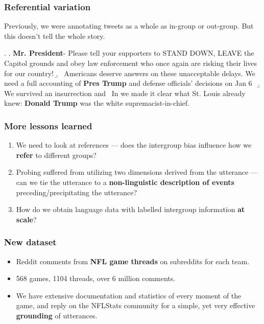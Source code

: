 \begin{frame}[c]\frametitle{Referential variation}
    Previously, we were annotating tweets as a whole as in-group or out-group. But this doesn't tell the whole story.\pause
    
    \ex. \label{ex:trump-tweets} \a.\label{ex:trump-tweet-1} \textbf{Mr. President}- Please tell your supporters to STAND DOWN, LEAVE the Capitol grounds and obey law enforcement who once again are risking their lives for our country!\textellipsis
    \b. \label{ex:trump-tweet-2} \textellipsis~Americans deserve answers on these unacceptable delays. We need a full accounting of \textbf{Pres Trump} and defense officials’ decisions on Jan 6~\textellipsis
    \b. \label{ex:trump-tweet-3} We survived an insurrection and \textellipsis~In we made it clear what St. Louis already knew: \textbf{Donald Trump} was the white supremacist-in-chief.    
    
\end{frame}


\begin{frame}[c]\frametitle{More lessons learned}

\begin{enumerate}
    \itemsep=\baselineskip
    \item We need to look at references --- does the intergroup bias influence how we \textbf{refer} to different groups?\pause
    \item Probing suffered from utilizing two dimensions derived from the utterance --- can we tie the utterance to a \textbf{non-linguistic description of events} preceding/precipitating the utterance?\pause
    \item How do we obtain language data with labelled intergroup information \textbf{at scale}?
\end{enumerate}
\end{frame}


\begin{frame}[c]\frametitle{New dataset}
    \begin{itemize}
        \itemsep=\baselineskip
        \item Reddit comments from \textbf{NFL game threads} on subreddits for each team.\pause
        \item 568 games, 1104 threads, over 6 million comments.\pause
        \item We have extensive documentation and statistics of every moment of the game, and reply on the NFLStats community for a simple, yet very effective \textbf{grounding} of utterances.
    \end{itemize}
\end{frame}


